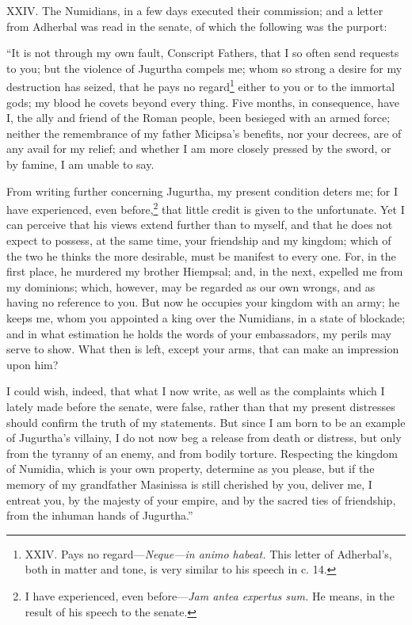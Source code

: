 XXIV. The Numidians, in a few days executed their commission; and a
letter from Adherbal was read in the senate, of which the following
was the purport:

``It is not through my own fault, Conscript Fathers, that I so often
send requests to you; but the violence of Jugurtha compels me; whom so
strong a desire for my destruction has seized, that he pays no
regard\footnote{XXIV. Pays no regard—\emph{Neque—in animo habeat.} This letter of
Adherbal's, both in matter and tone, is very similar to his speech
in c. 14.} either to you or to the immortal gods; my blood he covets
beyond every thing. Five months, in consequence, have I, the ally and
friend of the Roman people, been besieged with an armed force; neither
the remembrance of my father Micipsa's benefits, nor your decrees, are
of any avail for my relief; and whether I am more closely pressed by
the sword, or by famine, I am unable to say.

From writing further concerning Jugurtha, my present condition deters
me; for I have experienced, even before,\footnote{I have experienced, even before—\emph{Jam antea expertus sum.}
He means, in the result of his speech to the senate.} that little credit is
given to the unfortunate. Yet I can perceive that his views extend
further than to myself, and that he does not expect to possess, at the
same time, your friendship and my kingdom; which of the two he thinks
the more desirable, must be manifest to every one. For, in the first
place, he murdered my brother Hiempsal; and, in the next, expelled me
from my dominions; which, however, may be regarded as our own wrongs,
and as having no reference to you. But now he occupies your kingdom
with an army; he keeps me, whom you appointed a king over the
Numidians, in a state of blockade; and in what estimation he holds the
words of your embassadors, my perils may serve to show. What then is
left, except your arms, that can make an impression upon him?

I could wish, indeed, that what I now write, as well as the complaints
which I lately made before the senate, were false, rather than that my
present distresses should confirm the truth of my statements. But
since I am born to be an example of Jugurtha's villainy, I do not now
beg a release from death or distress, but only from the tyranny of an
enemy, and from bodily torture. Respecting the kingdom of Numidia,
which is your own property, determine as you please, but if the memory
of my grandfather Masinissa is still cherished by you, deliver me, I
entreat you, by the majesty of your empire, and by the sacred ties of
friendship, from the inhuman hands of Jugurtha.''

